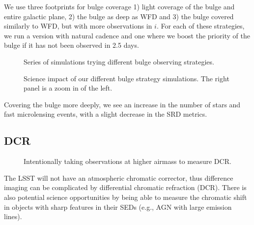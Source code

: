We use three footprints for bulge coverage 1) light coverage of the bulge and entire galactic plane, 2) the bulge as deep as WFD and 3) the bulge covered similarly to WFD, but with more observations in $i$.  For each of these strategies, we run a version with natural cadence and one where we boost the priority of the bulge if it has not been observed in 2.5 days. 

\begin{figure}
\caption{Series of simulations trying different bulge observing strategies.}\label{fig:bulge}
\end{figure}

\begin{figure}
\caption{Science impact of our different bulge strategy simulations. The right panel is a zoom in of the left.}\label{fig:bulgeradar}
\end{figure}

Covering the bulge more deeply, we see an increase in the number of stars and fast microlensing events, with a slight decrease in the SRD metrics.

\subsection{DCR}

\begin{figure}
\caption{Intentionally taking observations at higher airmass to measure DCR.}
\end{figure}


The LSST will not have an atmospheric chromatic corrector, thus difference imaging can be complicated by differential chromatic refraction (DCR). There is also potential science opportunities by being able to measure the chromatic shift in objects with sharp features in their SEDs (e.g., AGN with large emission lines).

